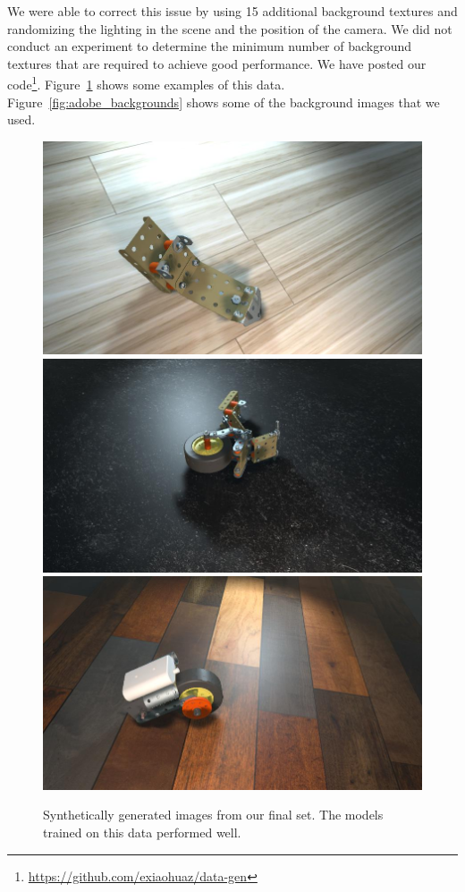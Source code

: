 We were able to correct this issue by using 15 additional background textures
and
randomizing the lighting in the scene and the position of the camera.
We did not conduct an experiment to determine the minimum number of background
textures that are required to achieve good performance.
We have posted our code\footnote{\url{https://github.com/exiaohuaz/data-gen}}.
Figure~\ref{fig:good_data} shows some examples of this data.
Figure~\ref{fig:adobe_backgrounds} shows some of the background images that we
used.

\begin{figure}
  \includegraphics[width=0.5\columnwidth]{figures/synthetic/floor1.jpg}
  \includegraphics[width=0.5\columnwidth]{figures/synthetic/floor2.jpg}
  \includegraphics[width=0.5\columnwidth]{figures/synthetic/floor3.jpg}
  \caption[Synthetically generated images from our final set]{
    Synthetically generated images from our final set.
    The models trained on this data performed well.
  }\label{fig:good_data}
\end{figure}

